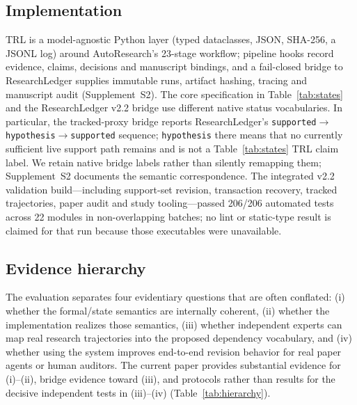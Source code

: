 \documentclass[journal]{IEEEtran}
\newcommand{\suppl}[1]{Supplement~#1}
\begin{document}
\subsection{Implementation}
TRL is a model-agnostic Python layer (typed dataclasses, JSON, SHA-256, a JSONL log) around AutoResearch's 23-stage workflow; pipeline hooks record evidence, claims, decisions and manuscript bindings, and a fail-closed bridge to ResearchLedger supplies immutable runs, artifact hashing, tracing and manuscript audit (\suppl{S2}). The core specification in Table~\ref{tab:states} and the ResearchLedger v2.2 bridge use different native status vocabularies. In particular, the tracked-proxy bridge reports ResearchLedger's \texttt{supported}$\to$\texttt{hypothesis}$\to$\texttt{supported} sequence; \texttt{hypothesis} there means that no currently sufficient live support path remains and is not a Table~\ref{tab:states} TRL claim label. We retain native bridge labels rather than silently remapping them; Supplement~S2 documents the semantic correspondence. The integrated v2.2 validation build---including support-set revision, transaction recovery, tracked trajectories, paper audit and study tooling---passed 206/206 automated tests across 22 modules in non-overlapping batches; no lint or static-type result is claimed for that run because those executables were unavailable.

\subsection{Evidence hierarchy}
The evaluation separates four evidentiary questions that are often conflated: (i) whether the formal/state semantics are internally coherent, (ii) whether the implementation realizes those semantics, (iii) whether independent experts can map real research trajectories into the proposed dependency vocabulary, and (iv) whether using the system improves end-to-end revision behavior for real paper agents or human auditors. The current paper provides substantial evidence for (i)--(ii), bridge evidence toward (iii), and protocols rather than results for the decisive independent tests in (iii)--(iv) (Table~\ref{tab:hierarchy}).
\end{document}
